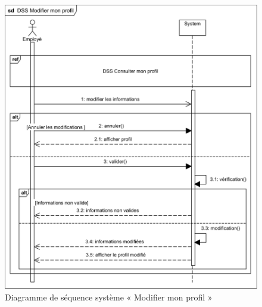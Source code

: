         \begin{figure}[h!]
             \centering
             \includegraphics[scale=1]{images/DSS/DSS Modifier mon profil.png}
             \caption{Diagramme de séquence système « Modifier mon profil »}
             \label{fig4}
        \end{figure}


